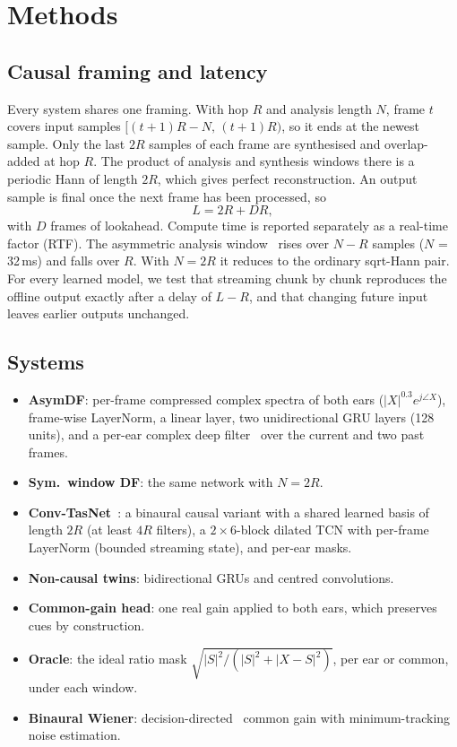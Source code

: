 \section{Methods}
\label{sec:methods}

\subsection{Causal framing and latency}
Every system shares one framing. With hop $R$ and analysis length $N$,
frame $t$ covers input samples $[(t{+}1)R-N,\,(t{+}1)R)$, so it ends at the
newest sample. Only the last $2R$ samples of each frame are synthesised and
overlap-added at hop $R$. The product of analysis and synthesis windows
there is a periodic Hann of length $2R$, which gives perfect
reconstruction. An output sample is final once the next frame has been
processed, so
\begin{equation}
L = 2R + D R,
\end{equation}
with $D$ frames of lookahead. Compute time is reported separately as a
real-time factor (RTF). The asymmetric analysis
window~\cite{mauler2007lowdelay,wang2023lowlatency} rises over $N-R$
samples ($N$ = 32\,ms) and falls over $R$. With $N=2R$ it reduces to the
ordinary sqrt-Hann pair. For every learned model, we test that streaming
chunk by chunk reproduces the offline output exactly after a delay of
$L-R$, and that changing future input leaves earlier outputs unchanged.

\subsection{Systems}
\begin{itemize}
\item \textbf{AsymDF}: per-frame compressed complex spectra of both ears
($|X|^{0.3}e^{j\angle X}$), frame-wise LayerNorm, a linear layer, two
unidirectional GRU layers (128 units), and a per-ear complex deep
filter~\cite{schroeter2022deepfilternet} over the current and two past
frames.
\item \textbf{Sym.\ window DF}: the same network with $N=2R$.
\item \textbf{Conv-TasNet}~\cite{luo2019convtasnet}: a binaural causal
variant with a shared learned basis of length $2R$ (at least $4R$ filters),
a $2{\times}6$-block dilated TCN with per-frame LayerNorm (bounded
streaming state), and per-ear masks.
\item \textbf{Non-causal twins}: bidirectional GRUs and centred
convolutions.
\item \textbf{Common-gain head}: one real gain applied to both ears, which
preserves cues by construction.
\item \textbf{Oracle}: the ideal ratio mask
$\sqrt{|S|^2/(|S|^2+|X{-}S|^2)}$, per ear or common, under each window.
\item \textbf{Binaural Wiener}: decision-directed~\cite{ephraim1984mmse}
common gain with minimum-tracking noise estimation.
\end{itemize}

